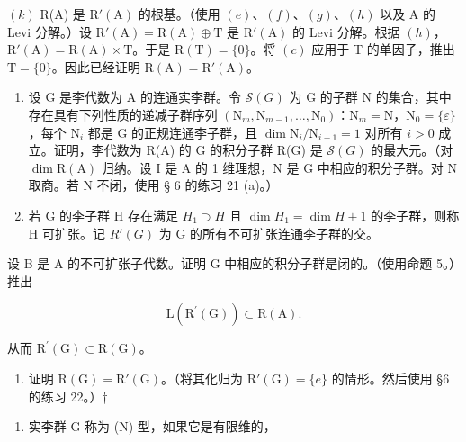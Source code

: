\((k)\) R(A) 是 \(\mathrm{R}'(\mathrm{A})\) 的根基。（使用 \((e)\)、\((f)\)、\((g)\)、\((h)\) 以及 A 的 Levi 分解。）设 \(\mathrm{R}'(\mathrm{A}) = \mathrm{R}(\mathrm{A}) \oplus \mathrm{T}\) 是 \(\mathrm{R}'(\mathrm{A})\) 的 Levi 分解。根据 \((h)\)，\(\mathrm{R}'(\mathrm{A}) = \mathrm{R}(\mathrm{A}) \times \mathrm{T}\)。于是 \(\mathrm{R}(\mathrm{T}) = \{0\}\)。将 \((c)\) 应用于 T 的单因子，推出 \(\mathrm{T} = \{0\}\)。因此已经证明 \(\mathrm{R}(\mathrm{A}) = \mathrm{R}'(\mathrm{A})\)。

\begin{enumerate}
\def\labelenumi{(\alph{enumi})}
\setcounter{enumi}{11}
\item
  设 G 是李代数为 A 的连通实李群。令 \(\mathcal{S}(G)\) 为 G 的子群 N 的集合，其中存在具有下列性质的递减子群序列 \((\mathrm{N}_m, \mathrm{N}_{m-1}, \ldots, \mathrm{N}_0)\)：\(\mathrm{N}_m = \mathrm{N}\)，\(\mathrm{N}_0 = \{\varepsilon\}\)，每个 \(\mathrm{N}_i\) 都是 G 的正规连通李子群，且 \(\dim \mathrm{N}_i / \mathrm{N}_{i-1} = 1\) 对所有 \(i > 0\) 成立。证明，李代数为 R(A) 的 G 的积分子群 R(G) 是 \(\mathcal{S}(G)\) 的最大元。（对 \(\dim \mathrm{R(A)}\) 归纳。设 I 是 A 的 1 维理想，N 是 G 中相应的积分子群。对 N 取商。若 N 不闭，使用 § 6 的练习 21 (a)。）
\item
  若 G 的李子群 H 存在满足 \(H_{1} \supset H\) 且 \(\dim H_{1} = \dim H + 1\) 的李子群，则称 H 可扩张。记 \(R'(G)\) 为 G 的所有不可扩张连通李子群的交。
\end{enumerate}

设 B 是 A 的不可扩张子代数。证明 G 中相应的积分子群是闭的。（使用命题 5。）推出

\[
\mathrm{L} (\mathrm{R} ^ {\prime} (\mathrm{G})) \subset \mathrm{R} (\mathrm{A}).
\]

从而 \(\mathrm{R}^{\prime}(\mathrm{G})\subset\mathrm{R}(\mathrm{G})\)。

\begin{enumerate}
\def\labelenumi{(\alph{enumi})}
\setcounter{enumi}{13}
\tightlist
\item
  证明 \(\mathrm{R}(\mathrm{G}) = \mathrm{R}'(\mathrm{G})\)。（将其化归为 \(\mathrm{R}'(\mathrm{G}) = \{e\}\) 的情形。然后使用 §6 的练习 22。）†
\end{enumerate}

\begin{enumerate}
\def\labelenumi{\arabic{enumi}.}
\setcounter{enumi}{28}
\tightlist
\item
  实李群 G 称为 (N) 型，如果它是有限维的，
\end{enumerate}

